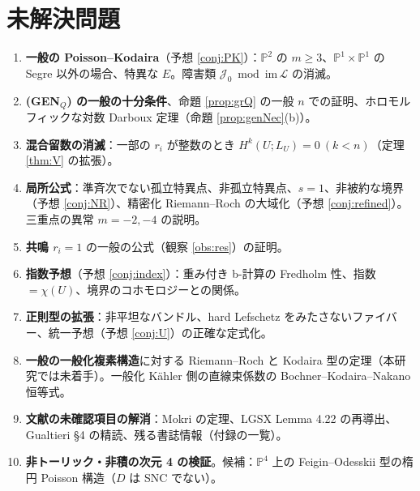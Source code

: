 \section{未解決問題}\label{sec:open}
\begin{enumerate}
\item \textbf{一般の Poisson--Kodaira}（予想 \ref{conj:PK}）：$\mathbb P^2$ の $m\ge3$、$\mathbb P^1\times\mathbb P^1$ の Segre 以外の場合、特異な $E$。障害類 $\mathcal J_0\bmod\mathrm{im}\,\mathcal L$ の消滅。
\item \textbf{(GEN$_Q$) の一般の十分条件}、命題 \ref{prop:grQ} の一般 $n$ での証明、ホロモルフィックな対数 Darboux 定理（命題 \ref{prop:genNec}(b)）。
\item \textbf{混合留数の消滅}：一部の $r_i$ が整数のとき $H^k(U;L_U)=0\ (k<n)$（定理 \ref{thm:V} の拡張）。
\item \textbf{局所公式}：準斉次でない孤立特異点、非孤立特異点、$s=1$、非被約な境界（予想 \ref{conj:NR}）、精密化 Riemann--Roch の大域化（予想 \ref{conj:refined}）。三重点の異常 $m=-2,-4$ の説明。
\item \textbf{共鳴 $r_i=1$} の一般の公式（観察 \ref{obs:res}）の証明。
\item \textbf{指数予想}（予想 \ref{conj:index}）：重み付き b-計算の Fredholm 性、指数 $=\chi(U)$、境界のコホモロジーとの関係。
\item \textbf{正則型の拡張}：非平坦なバンドル、hard Lefschetz をみたさないファイバー、統一予想（予想 \ref{conj:U}）の正確な定式化。
\item \textbf{一般の一般化複素構造}に対する Riemann--Roch と Kodaira 型の定理（本研究では未着手）。一般化 Kähler 側の直線束係数の Bochner--Kodaira--Nakano 恒等式。
\item \textbf{文献の未確認項目の解消}：Mokri の定理、LGSX Lemma 4.22 の再導出、Gualtieri \cite{Gua11} \S4 の精読、残る書誌情報（付録の一覧）。
\item \textbf{非トーリック・非積の次元 4 の検証}。候補：$\mathbb P^4$ 上の Feigin--Odesskii 型の楕円 Poisson 構造（$D$ は SNC でない）。
\end{enumerate}
